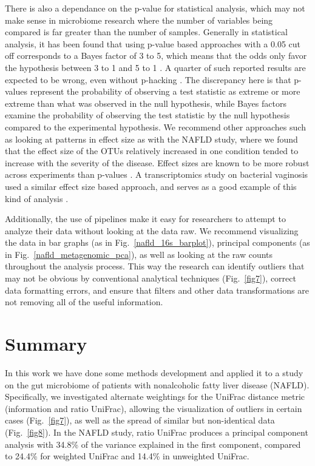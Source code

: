 There is also a dependance on the p-value for statistical analysis, which may not make sense in microbiome research where the number of variables being compared is far greater than the number of samples. Generally in statistical analysis, it has been found that using p-value based approaches with a 0.05 cut off corresponds to a Bayes factor of 3 to 5, which means that the odds only favor the hypothesis between 3 to 1 and 5 to 1 \cite{johnson2013revised}. A quarter of such reported results are expected to be wrong, even without p-hacking \cite{johnson2013revised}. The discrepancy here is that p-values represent the probability of observing a test statistic as extreme or more extreme than what was observed in the null hypothesis, while Bayes factors examine the probability of observing the test statistic by the null hypothesis compared to the experimental hypothesis. We recommend other approaches such as looking at patterns in effect size as with the NAFLD study, where we found that the effect size of the OTUs relatively increased in one condition tended to increase with the severity of the disease. Effect sizes are known to be more robust across experiments than p-values \cite{halsey2015fickle}. A transcriptomics study on bacterial vaginosis used a similar effect size based approach, and serves as a good example of this kind of analysis \cite{macklaim2013comparative}.

Additionally, the use of pipelines make it easy for researchers to attempt to analyze their data without looking at the data raw. We recommend visualizing the data in bar graphs (as in Fig.~\ref{nafld_16s_barplot}), principal components (as in Fig.~\ref{nafld_metagenomic_pca}), as well as looking at the raw counts throughout the analysis process. This way the research can identify outliers that may not be obvious by conventional analytical techniques (Fig.~\ref{fig7}), correct data formatting errors, and ensure that filters and other data transformations are not removing all of the useful information.

\section{Summary}

In this work we have done some methods development and applied it to a study on the gut microbiome of patients with nonalcoholic fatty liver disease (NAFLD). Specifically, we investigated alternate weightings for the UniFrac distance metric (information and ratio UniFrac), allowing the visualization of outliers in certain cases (Fig.~\ref{fig7}), as well as the spread of similar but non-identical data (Fig.~\ref{fig8}). In the NAFLD study, ratio UniFrac produces a principal component analysis with 34.8\% of the variance explained in the first component, compared to 24.4\% for weighted UniFrac and 14.4\% in unweighted UniFrac.

